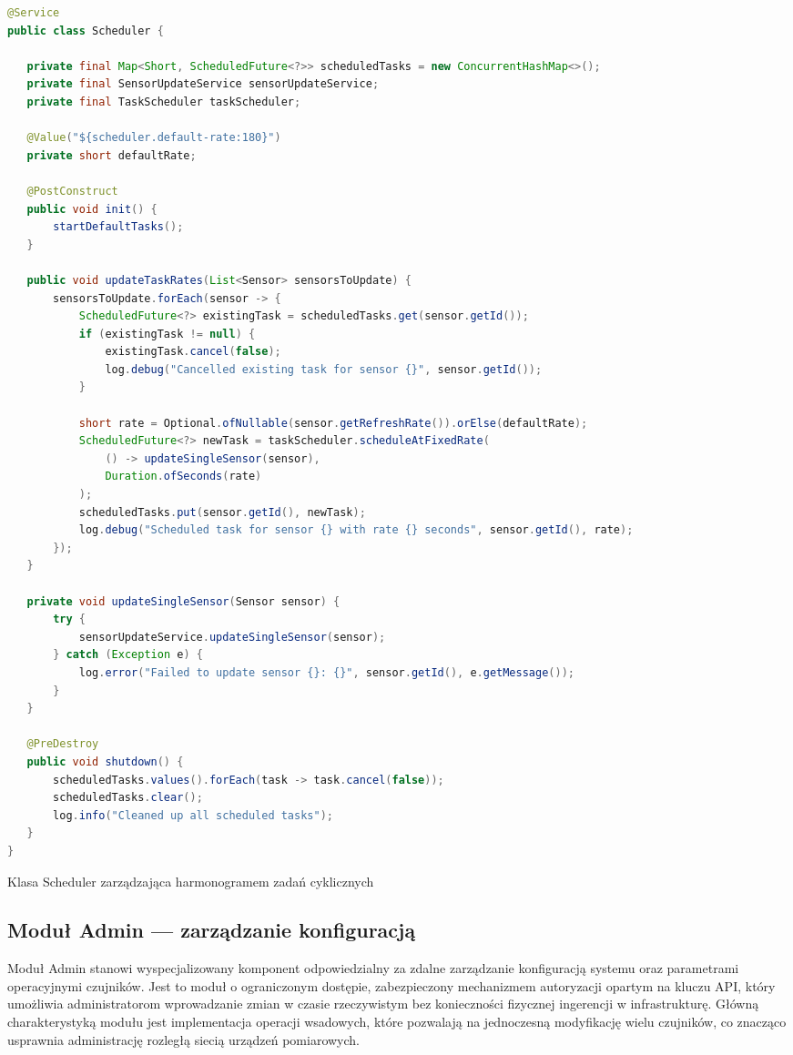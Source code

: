 \documentclass[a4paper,12pt,openany]{book}
\begin{document}
\vspace{1em}
\begin{lstlisting}[language=java]
@Service
public class Scheduler {

   private final Map<Short, ScheduledFuture<?>> scheduledTasks = new ConcurrentHashMap<>();
   private final SensorUpdateService sensorUpdateService;
   private final TaskScheduler taskScheduler;

   @Value("${scheduler.default-rate:180}")
   private short defaultRate;

   @PostConstruct
   public void init() {
       startDefaultTasks();
   }

   public void updateTaskRates(List<Sensor> sensorsToUpdate) {
       sensorsToUpdate.forEach(sensor -> {
           ScheduledFuture<?> existingTask = scheduledTasks.get(sensor.getId());
           if (existingTask != null) {
               existingTask.cancel(false);
               log.debug("Cancelled existing task for sensor {}", sensor.getId());
           }

           short rate = Optional.ofNullable(sensor.getRefreshRate()).orElse(defaultRate);
           ScheduledFuture<?> newTask = taskScheduler.scheduleAtFixedRate(
               () -> updateSingleSensor(sensor),
               Duration.ofSeconds(rate)
           );
           scheduledTasks.put(sensor.getId(), newTask);
           log.debug("Scheduled task for sensor {} with rate {} seconds", sensor.getId(), rate);
       });
   }

   private void updateSingleSensor(Sensor sensor) {
       try {
           sensorUpdateService.updateSingleSensor(sensor);
       } catch (Exception e) {
           log.error("Failed to update sensor {}: {}", sensor.getId(), e.getMessage());
       }
   }

   @PreDestroy
   public void shutdown() {
       scheduledTasks.values().forEach(task -> task.cancel(false));
       scheduledTasks.clear();
       log.info("Cleaned up all scheduled tasks");
   }
}
\end{lstlisting}
\caption{Klasa Scheduler zarządzająca harmonogramem zadań cyklicznych}
\label{lst:scheduler}

\subsection{Moduł Admin --- zarządzanie konfiguracją}

Moduł Admin stanowi wyspecjalizowany komponent odpowiedzialny za zdalne zarządzanie konfiguracją systemu oraz parametrami operacyjnymi czujników. Jest to moduł o ograniczonym dostępie, zabezpieczony mechanizmem autoryzacji opartym na kluczu API, który umożliwia administratorom wprowadzanie zmian w czasie rzeczywistym bez konieczności fizycznej ingerencji w infrastrukturę. Główną charakterystyką modułu jest implementacja operacji wsadowych, które pozwalają na jednoczesną modyfikację wielu czujników, co znacząco usprawnia administrację rozległą siecią urządzeń pomiarowych.
\end{document}
